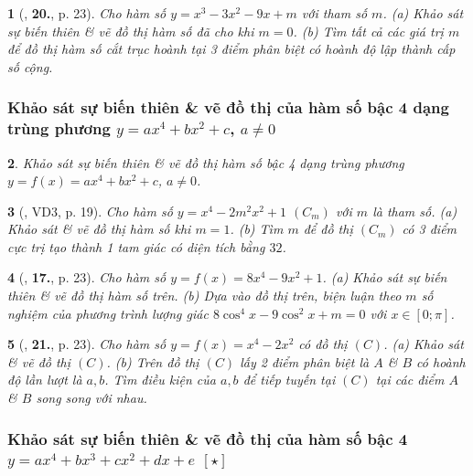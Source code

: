 \documentclass{article}
\newtheorem{baitoan}{}
\begin{document}
\begin{baitoan}[\cite{TLCT_giai_tich_12}, \textbf{20.}, p. 23]
	Cho hàm số $y = x^3 - 3x^2 - 9x + m$ với tham số $m$. (a) Khảo sát sự biến thiên \& vẽ đồ thị hàm số đã cho khi $m = 0$. (b) Tìm tất cả các giá trị $m$ để đồ thị hàm số cắt trục hoành tại 3 điểm phân biệt có hoành độ lập thành cấp số cộng.	
\end{baitoan}

\subsubsection{Khảo sát sự biến thiên \& vẽ đồ thị của hàm số bậc 4 dạng trùng phương $y = ax^4 + bx^2 + c$, $a\ne 0$}

\begin{baitoan}
	Khảo sát sự biến thiên \& vẽ đồ thị hàm số bậc 4 dạng trùng phương $y = f(x) = ax^4 + bx^2 + c$, $a\ne 0$.
\end{baitoan}

\begin{baitoan}[\cite{TLCT_giai_tich_12}, VD3, p. 19]
	Cho hàm số $y = x^4 - 2m^2x^2 + 1$ $(C_m)$ với $m$ là tham số. (a) Khảo sát \& vẽ đồ thị hàm số khi $m = 1$. (b) Tìm $m$ để đồ thị $(C_m)$ có 3 điểm cực trị tạo thành 1 tam giác có diện tích bằng $32$.	
\end{baitoan}

\begin{baitoan}[\cite{TLCT_giai_tich_12}, \textbf{17.}, p. 23]
	Cho hàm số $y = f(x) = 8x^4 - 9x^2 + 1$. (a) Khảo sát sự biến thiên \& vẽ đồ thị hàm số trên. (b) Dựa vào đồ thị trên, biện luận theo $m$ số nghiệm của phương trình lượng giác $8\cos^4x - 9\cos^2x + m = 0$ với $x\in[0;\pi]$.
\end{baitoan}

\begin{baitoan}[\cite{TLCT_giai_tich_12}, \textbf{21.}, p. 23]
	Cho hàm số $y = f(x) = x^4 - 2x^2$ có đồ thị $(C)$. (a) Khảo sát \& vẽ đồ thị $(C)$. (b) Trên đồ thị $(C)$ lấy 2 điểm phân biệt là $A$ \& $B$ có hoành độ lần lượt là $a,b$. Tìm điều kiện của $a,b$ để tiếp tuyến tại $(C)$ tại các điểm $A$ \& $B$ song song với nhau.
\end{baitoan}

\subsubsection{Khảo sát sự biến thiên \& vẽ đồ thị của hàm số bậc 4 $y = ax^4 + bx^3 + cx^2 + dx + e$ $[\star]$}
\end{document}
